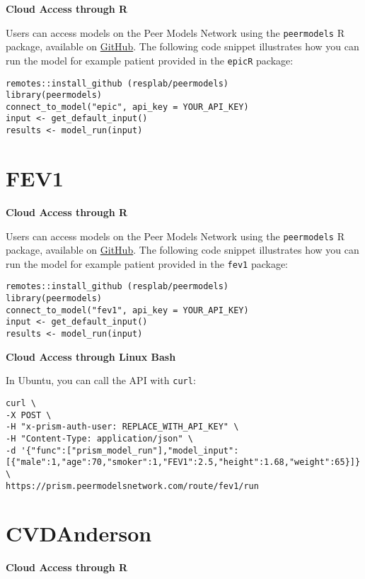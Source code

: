\documentclass[
]{book}
\begin{document}
\textbf{Cloud Access through R}

Users can access models on the Peer Models Network using the \texttt{peermodels} R package, available on \href{https://github.com/resplab/peermodels}{GitHub}. The following code snippet illustrates how you can run the model for example patient provided in the \texttt{epicR} package:

\begin{verbatim}
remotes::install_github (resplab/peermodels)
library(peermodels)
connect_to_model("epic", api_key = YOUR_API_KEY)
input <- get_default_input()
results <- model_run(input)
\end{verbatim}

\hypertarget{fev1}{%
\section{FEV1}\label{fev1}}

\textbf{Cloud Access through R}

Users can access models on the Peer Models Network using the \texttt{peermodels} R package, available on \href{https://github.com/resplab/peermodels}{GitHub}. The following code snippet illustrates how you can run the model for example patient provided in the \texttt{fev1} package:

\begin{verbatim}
remotes::install_github (resplab/peermodels)
library(peermodels)
connect_to_model("fev1", api_key = YOUR_API_KEY)
input <- get_default_input()
results <- model_run(input)
\end{verbatim}

\textbf{Cloud Access through Linux Bash}

In Ubuntu, you can call the API with \texttt{curl}:

\begin{verbatim}
curl \
-X POST \
-H "x-prism-auth-user: REPLACE_WITH_API_KEY" \
-H "Content-Type: application/json" \
-d '{"func":["prism_model_run"],"model_input":[{"male":1,"age":70,"smoker":1,"FEV1":2.5,"height":1.68,"weight":65}]}' \
https://prism.peermodelsnetwork.com/route/fev1/run
\end{verbatim}

\hypertarget{cvdanderson}{%
\section{CVDAnderson}\label{cvdanderson}}

\textbf{Cloud Access through R}
\end{document}
